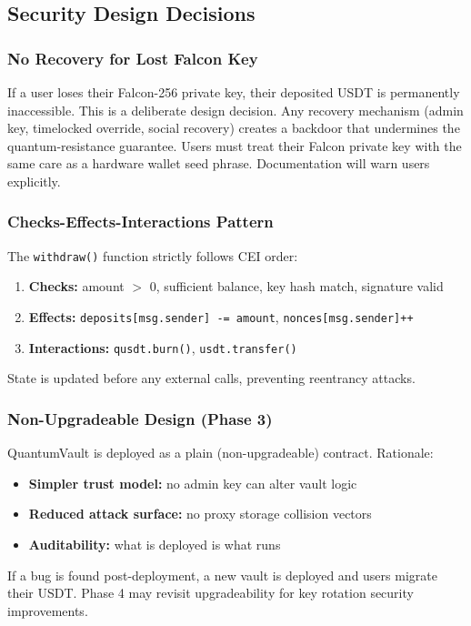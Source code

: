 \documentclass[11pt,a4paper]{article}
\begin{document}
\subsection{Security Design Decisions}

\subsubsection{No Recovery for Lost Falcon Key}

\begin{warningbox}[Critical: Lost Falcon key = permanently locked funds]
If a user loses their Falcon-256 private key, their deposited USDT is permanently inaccessible. This is a deliberate design decision. Any recovery mechanism (admin key, timelocked override, social recovery) creates a backdoor that undermines the quantum-resistance guarantee. Users must treat their Falcon private key with the same care as a hardware wallet seed phrase. Documentation will warn users explicitly.
\end{warningbox}

\subsubsection{Checks-Effects-Interactions Pattern}

The \texttt{withdraw()} function strictly follows CEI order:
\begin{enumerate}
  \item \textbf{Checks:} amount $>$ 0, sufficient balance, key hash match, signature valid
  \item \textbf{Effects:} \texttt{deposits[msg.sender] -= amount}, \texttt{nonces[msg.sender]++}
  \item \textbf{Interactions:} \texttt{qusdt.burn()}, \texttt{usdt.transfer()}
\end{enumerate}

State is updated before any external calls, preventing reentrancy attacks.

\subsubsection{Non-Upgradeable Design (Phase 3)}

\begin{infobox}
QuantumVault is deployed as a plain (non-upgradeable) contract. Rationale:
\begin{itemize}
  \item \textbf{Simpler trust model:} no admin key can alter vault logic
  \item \textbf{Reduced attack surface:} no proxy storage collision vectors
  \item \textbf{Auditability:} what is deployed is what runs
\end{itemize}
If a bug is found post-deployment, a new vault is deployed and users migrate their USDT. Phase 4 may revisit upgradeability for key rotation security improvements.
\end{infobox}
\end{document}
